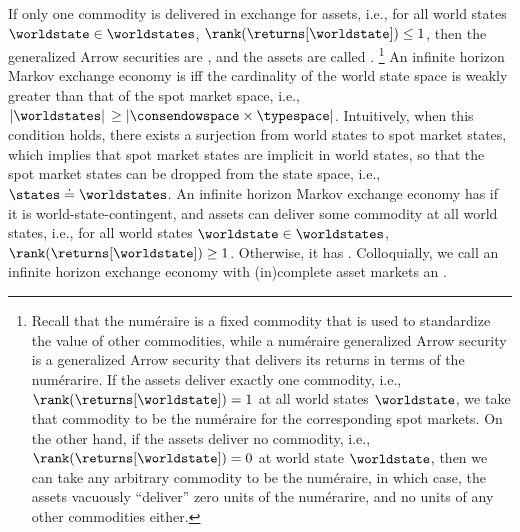 
\begin{remark}
If only one commodity is delivered in exchange for assets,
i.e., for all world states $\worldstate \in \worldstates$, $\rank(\returns[\worldstate]) \leq 1$, then the generalized Arrow securities are , and the assets are called .%
\footnote{Recall that the num\'eraire is a fixed commodity that is used to standardize the value of other commodities, while a num\'eraire generalized Arrow security is a generalized Arrow security that delivers its returns in terms of the num\'erarire. 
If the assets deliver exactly one commodity, i.e., $\rank (\returns[\worldstate]) = 1$ at all world states $\worldstate$, we take that commodity to be the num\'eraire for the corresponding spot markets.
On the other hand, if the assets deliver no commodity, i.e., $\rank (\returns[\worldstate]) = 0$ at world state $\worldstate$, then we can take any arbitrary commodity to be the num\'eraire, in which case, the assets vacuously ``deliver'' zero units of the num\'erarire, and no units of any other commodities either.}
An infinite horizon Markov exchange economy is  iff the cardinality of the world state space is weakly greater than that of the spot market space, i.e., $|\worldstates| \, \geq |\consendowspace \times \typespace|$. 
Intuitively, when this condition holds,
there exists a surjection from world states to spot market states, which implies that spot market states are implicit in
world states, so that the spot market states can be dropped from the state space, i.e., $\states \doteq \worldstates$.
An infinite horizon Markov exchange economy has  if it is world-state-contingent, and assets can deliver some commodity at all world states, i.e., for all world states $\worldstate \in \worldstates$, $\rank(\returns[\worldstate]) \geq 1$.
Otherwise, it has .
Colloquially, we call an infinite horizon exchange economy with (in)complete asset markets an . 

\end{remark}
